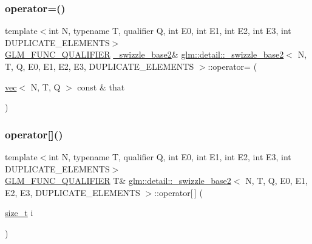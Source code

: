 \mbox{\label{structglm_1_1detail_1_1__swizzle__base2_a70f9bb1c990a71a55d125abc36c6849b}} 
\subsubsection{\texorpdfstring{operator=()}{operator=()}\hspace{0.1cm}{\footnotesize\ttfamily [2/2]}}
{\footnotesize\ttfamily template$<$int N, typename T, qualifier Q, int E0, int E1, int E2, int E3, int D\+U\+P\+L\+I\+C\+A\+T\+E\+\_\+\+E\+L\+E\+M\+E\+N\+TS$>$ \\
\hyperlink{setup_8hpp_a33fdea6f91c5f834105f7415e2a64407}{G\+L\+M\+\_\+\+F\+U\+N\+C\+\_\+\+Q\+U\+A\+L\+I\+F\+I\+ER} \hyperlink{structglm_1_1detail_1_1__swizzle__base2}{\+\_\+swizzle\+\_\+base2}\& \hyperlink{structglm_1_1detail_1_1__swizzle__base2}{glm\+::detail\+::\+\_\+swizzle\+\_\+base2}$<$ N, T, Q, E0, E1, E2, E3, D\+U\+P\+L\+I\+C\+A\+T\+E\+\_\+\+E\+L\+E\+M\+E\+N\+TS $>$\+::operator= (\begin{DoxyParamCaption}\item[{\hyperlink{structglm_1_1vec}{vec}$<$ N, T, Q $>$ const \&}]{that }\end{DoxyParamCaption})\hspace{0.3cm}{\ttfamily [inline]}}

\mbox{\label{structglm_1_1detail_1_1__swizzle__base2_a9a31c29fd5419a40ef6ae9dbbbb3887e}} 
\subsubsection{\texorpdfstring{operator[]()}{operator[]()}\hspace{0.1cm}{\footnotesize\ttfamily [1/2]}}
{\footnotesize\ttfamily template$<$int N, typename T, qualifier Q, int E0, int E1, int E2, int E3, int D\+U\+P\+L\+I\+C\+A\+T\+E\+\_\+\+E\+L\+E\+M\+E\+N\+TS$>$ \\
\hyperlink{setup_8hpp_a33fdea6f91c5f834105f7415e2a64407}{G\+L\+M\+\_\+\+F\+U\+N\+C\+\_\+\+Q\+U\+A\+L\+I\+F\+I\+ER} T\& \hyperlink{structglm_1_1detail_1_1__swizzle__base2}{glm\+::detail\+::\+\_\+swizzle\+\_\+base2}$<$ N, T, Q, E0, E1, E2, E3, D\+U\+P\+L\+I\+C\+A\+T\+E\+\_\+\+E\+L\+E\+M\+E\+N\+TS $>$\+::operator\mbox{[}$\,$\mbox{]} (\begin{DoxyParamCaption}\item[{\hyperlink{_s_d_l__config__winrt_8h_a7c94ea6f8948649f8d181ae55911eeaf}{size\+\_\+t}}]{i }\end{DoxyParamCaption})\hspace{0.3cm}{\ttfamily [inline]}}

